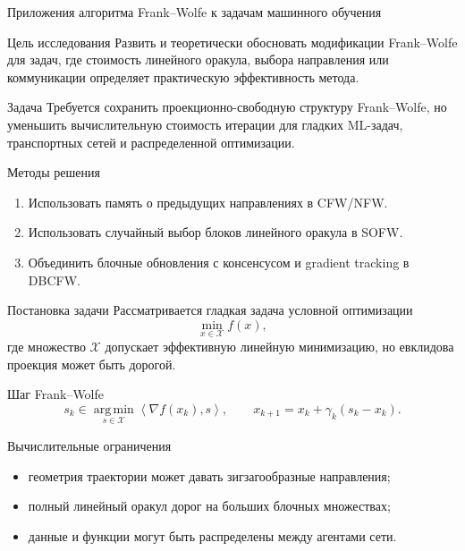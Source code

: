 \documentclass[aspectratio=169,10pt,pdf,hyperref={unicode}]{beamer}
\title[\hbox to 56mm{\PresentationShortTitle}]{\PresentationTitle}
\author[И.\,Н.~Игнашин]{\PresentationAuthor\\
\small \PresentationSupervisor}
\institute{
\PresentationInstitute\\
\PresentationSpecialization\\
Направление: \PresentationProgram
}
\date{\PresentationPlaceDate}
\newcommand{\cX}{\mathcal{X}}
\newcommand{\inner}[2]{\left\langle #1,#2 \right\rangle}
\newcommand{\argmin}{\operatorname*{arg\,min}}
\begin{document}
\begin{frame}
    \thispagestyle{empty}
    \maketitle
\end{frame}

\begin{frame}{Приложения алгоритма Frank--Wolfe к задачам машинного обучения}
\begin{block}{Цель исследования}
\justifying
Развить и теоретически обосновать модификации Frank--Wolfe для задач,
где стоимость линейного оракула, выбора направления или коммуникации определяет
практическую эффективность метода.
\end{block}

\begin{block}{Задача}
\justifying
Требуется сохранить проекционно-свободную структуру Frank--Wolfe, но уменьшить
вычислительную стоимость итерации для гладких ML-задач, транспортных сетей и
распределенной оптимизации.
\end{block}

\begin{block}{Методы решения}
\begin{enumerate}
\justifying
    \item Использовать память о предыдущих направлениях в CFW/NFW.
    \item Использовать случайный выбор блоков линейного оракула в SOFW.
    \item Объединить блочные обновления с консенсусом и gradient tracking в DBCFW.
\end{enumerate}
\end{block}
\end{frame}

\begin{frame}{Постановка задачи}
\justifying
Рассматривается гладкая задача условной оптимизации
\[
    \min_{x\in\cX} f(x),
\]
где множество $\cX$ допускает эффективную линейную минимизацию, но евклидова
проекция может быть дорогой.

\begin{block}{Шаг Frank--Wolfe}
\[
    s_k\in\argmin_{s\in\cX}\inner{\nabla f(x_k)}{s},
    \qquad
    x_{k+1}=x_k+\gamma_k(s_k-x_k).
\]
\end{block}

\begin{block}{Вычислительные ограничения}
\begin{itemize}
    \item геометрия траектории может давать зигзагообразные направления;
    \item полный линейный оракул дорог на больших блочных множествах;
    \item данные и функции могут быть распределены между агентами сети.
\end{itemize}
\end{block}
\end{frame}
\end{document}

